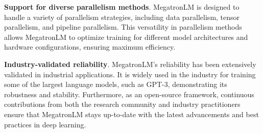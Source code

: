 \begin{enumerate}[label={[\arabic*]}, itemsep=0pt, leftmargin=*,topsep=0pt]
    \item \textbf{Support for diverse parallelism methods}. MegatronLM is designed to handle a variety of parallelism strategies, including data parallelism, tensor parallelism, and pipeline parallelism. This versatility in parallelism methods allows MegatronLM to optimize training for different model architectures and hardware configurations, ensuring maximum efficiency.
    \item \textbf{Industry-validated reliability}. MegatronLM's reliability has been extensively validated in industrial applications. It is widely used in the industry for training some of the largest language models, such as GPT-3, demonstrating its robustness and stability. Furthermore, as an open-source framework, continuous contributions from both the research community and industry practitioners ensure that MegatronLM stays up-to-date with the latest advancements and best practices in deep learning.
\end{enumerate}





